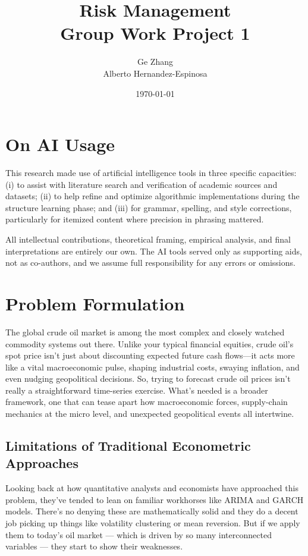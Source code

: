 \documentclass[11pt,a4paper]{article}
\title{Risk Management \\ Group Work Project 1}
\author{Ge Zhang \\ Alberto Hernandez-Espinosa}
\date{\today}
\begin{document}
\maketitle



\section*{On AI Usage}

This research made use of artificial intelligence tools in three 
specific capacities: (i) to assist with literature search and verification 
of academic sources and datasets; (ii) to help refine and optimize algorithmic 
implementations during the structure learning phase; and (iii) for grammar, 
spelling, and style corrections, particularly for itemized content where precision 
in phrasing mattered.

All intellectual contributions, theoretical framing, empirical analysis, 
and final interpretations are entirely our own. The AI tools served only as 
supporting aids, not as co-authors, and we assume full responsibility for any errors or omissions.



\section{Problem Formulation}
The global crude oil market is among the most complex and closely watched commodity systems out 
there. Unlike your typical financial equities, crude oil’s spot price isn’t just about 
discounting expected future cash flows—it acts more like a vital macroeconomic pulse, 
shaping industrial costs, swaying inflation, and even nudging geopolitical decisions. 
So, trying to forecast crude oil prices isn’t really a straightforward time-series 
exercise. What’s needed is a broader framework, one that can tease apart 
how macroeconomic forces, supply-chain mechanics at the micro level, and 
unexpected geopolitical events all intertwine.

\subsection{Limitations of Traditional Econometric Approaches}

Looking back at how quantitative analysts and economists have approached 
this problem, they've tended to lean on familiar workhorses like ARIMA 
and GARCH models. There's no denying these are mathematically solid and 
they do a decent job picking up things like volatility clustering or mean reversion. 
But if we apply them to today's oil market — which is driven by so many interconnected 
variables — they start to show their weaknesses.
\end{document}
